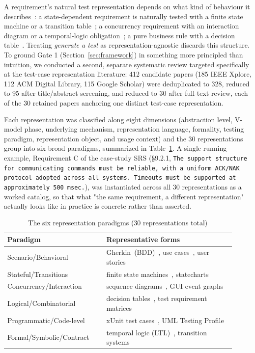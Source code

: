 \documentclass[conference]{IEEEtran}
\begin{document}
A requirement's natural test representation depends on what kind of behaviour
it describes~\cite{utting2012taxonomy,ammann2016introduction}: a state-dependent requirement is naturally tested with a finite
state machine or a transition table~\cite{chow1978fsm,lee1996fsm}; a concurrency requirement with an
interaction diagram or a temporal-logic obligation~\cite{briand2002uml,pnueli1977temporal}; a pure business rule with
a decision table~\cite{myers2011art}. Treating \textit{generate a test} as representation-agnostic
discards this structure. To ground Gate 1 (Section~\ref{sec:framework}) in
something more principled than intuition, we conducted a second, separate
systematic review targeted specifically at the test-case representation
literature: 412 candidate papers (185 IEEE Xplore, 112 ACM Digital Library,
115 Google Scholar) were deduplicated to 328, reduced to 95 after
title/abstract screening, and reduced to 30 after full-text review, each of
the 30 retained papers anchoring one distinct test-case representation.

Each representation was classified along eight dimensions (abstraction level,
V-model phase, underlying mechanism, representation language, formality,
testing paradigm, representation object, and usage context) and the 30
representations group into six broad paradigms, summarized in
Table~\ref{tab:paradigms}. A single running example, Requirement C of the
case-study SRS (\S9.2.1, \texttt{The support structure for communicating commands
must be reliable, with a uniform ACK/NAK protocol adopted across all systems.
Timeouts must be supported at approximately 500 msec.}), was instantiated
across all 30 representations as a worked catalog, so that what "the same
requirement, a different representation" actually looks like in practice is
concrete rather than asserted.

\begin{table}[t]
\centering
\caption{The six representation paradigms (30 representations total)}
\label{tab:paradigms}
\small
\begin{tabular}{@{}p{0.40\linewidth}p{0.52\linewidth}@{}}
\toprule
\textbf{Paradigm} & \textbf{Representative forms} \\
\midrule
Scenario/Behavioral & Gherkin~(BDD)~\cite{wynne2012cucumber}, use cases~\cite{nebut2006usecase}, user stories \\
Stateful/Transitions & finite state machines~\cite{chow1978fsm}, statecharts~\cite{harel1987statecharts} \\
Concurrency/Interaction & sequence diagrams~\cite{briand2002uml}, GUI event graphs~\cite{memon2001gui,memon2007eventflow} \\
Logical/Combinatorial~\cite{ostrand1988category,grochtmann1993classification,nie2011combinatorial} & decision tables~\cite{myers2011art}, test requirement matrices \\
Programmatic/Code-level & xUnit test cases~\cite{meszaros2007xunit}, UML Testing Profile~\cite{baker2008utp} \\
Formal/Symbolic/Contract & temporal logic (LTL)~\cite{pnueli1977temporal}, transition systems \\
\bottomrule
\end{tabular}
\end{table}
\end{document}
